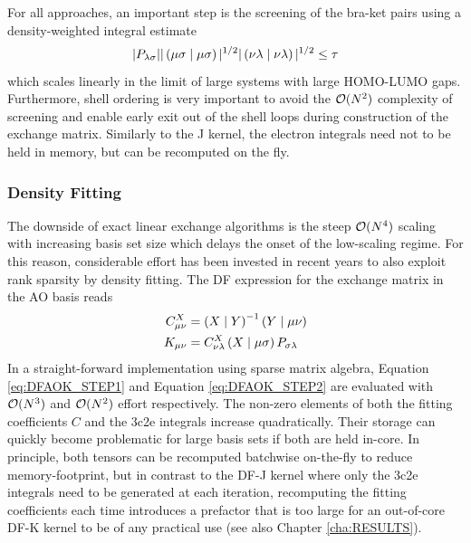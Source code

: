 For all approaches, an important step is the screening of the bra-ket pairs using a density-weighted integral estimate
\begin{equation}
|P_{\lambda\sigma}||\left( \mu\sigma \mid \mu\sigma \right)|^{1/2} |\left( \nu\lambda \mid \nu\lambda \right)|^{1/2} \leq \tau
\end{equation}
\noindent which scales linearly in the limit of large systems with large HOMO-LUMO gaps. Furthermore, shell ordering is very important to avoid the $\mathcal{O}(N^{2})$ complexity of screening and enable early exit out of the shell loops during construction of the exchange matrix. Similarly to the J kernel, the electron integrals need not to be held in memory, but can be recomputed on the fly.


\subsubsection{Density Fitting}

The downside of exact linear exchange algorithms is the steep $\mathcal{O}(N^{4})$ scaling with increasing basis set size which delays the onset of the low-scaling regime. For this reason, considerable effort has been invested in recent years to also exploit rank sparsity by density fitting. The DF expression for the exchange matrix in the AO basis reads
\begin{align}
C^X_{\mu\nu} &= \left( X \mid Y \right)^{-1} \left( Y \mid \mu\nu \right) \label{eq:DFAOK_STEP1}\\
K_{\mu\nu} &= C^X_{\nu\lambda} \left( X \mid \mu \sigma \right) P_{\sigma\lambda} \label{eq:DFAOK_STEP2}
\end{align}
\noindent In a straight-forward implementation using sparse matrix algebra, Equation \ref{eq:DFAOK_STEP1} and Equation \ref{eq:DFAOK_STEP2} are evaluated with $\mathcal{O}(N^{3})$  and $\mathcal{O}(N^{2})$ effort respectively. The non-zero elements of both the fitting coefficients $C$ and the 3c2e integrals increase quadratically. Their storage can quickly become problematic for large basis sets if both are held in-core. In principle, both tensors can be recomputed batchwise on-the-fly to reduce memory-footprint, but in contrast to the DF-J kernel where only the 3c2e integrals need to be generated at each iteration, recomputing the fitting coefficients each time introduces a prefactor that is too large for an out-of-core DF-K kernel to be of any practical use (see also Chapter \ref{cha:RESULTS}).

